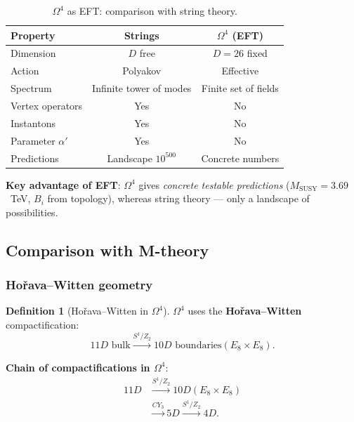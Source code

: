 \documentclass[11pt,a4paper]{article}
\newcommand{\CY}{\ensuremath{CY_3}}
\newcommand{\Om}{\ensuremath{\Omega^4}}
\theoremstyle{definition}
\newtheorem{definition}[theorem]{Definition}
\begin{document}
\begin{table}[ht]
\centering
\caption{\texorpdfstring{$\Om$}{} as EFT: comparison with string theory.}
\label{tab:string-eft-vs}
\begin{tabular}{lcc}
\toprule
Property & Strings & $\Om$ (EFT) \\
\midrule
Dimension & $D$ free & $D = 26$ fixed \\
Action & Polyakov & Effective \\
Spectrum & Infinite tower of modes & Finite set of fields \\
Vertex operators & Yes & No \\
Instantons & Yes & No \\
Parameter $\alpha'$ & Yes & No \\
Predictions & Landscape $10^{500}$ & Concrete numbers \\
\bottomrule
\end{tabular}
\end{table}

\medskip\noindent
\textbf{Key advantage of EFT}: $\Om$ gives \emph{concrete
testable predictions} ($M_{\text{SUSY}} = 3.69$~TeV,
$B_i$ from topology), whereas string theory ---
only a landscape of possibilities.

\subsection{Comparison with M-theory}
\label{subsec:string-mtheory}

\subsubsection{Ho\v{r}ava--Witten geometry}

\begin{definition}[Ho\v{r}ava--Witten in $\Om$]
\label{def:string-horava-witten}
$\Om$ uses the \textbf{Ho\v{r}ava--Witten} compactification:
\begin{equation}
    11D \text{ bulk} \xrightarrow{S^1/Z_2} 10D \text{ boundaries}
    (E_8 \times E_8).
    \label{eq:string-horava-witten}
\end{equation}
\end{definition}

\medskip\noindent
\textbf{Chain of compactifications in $\Om$}:
\begin{equation}
    \boxed{
    \begin{aligned}
    11D &\xrightarrow{S^1/Z_2} 10D (E_8 \times E_8) \\
        &\xrightarrow{\CY} 5D \xrightarrow{S^1/Z_2} 4D.
    \end{aligned}}
    \label{eq:string-compact-chain}
\end{equation}
\end{document}
